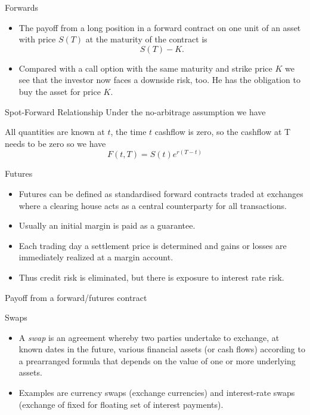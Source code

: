 {Forwards}
\begin{itemize}
\item<1->
The payoff from a long position in a forward contract on one unit
of an asset with price $S(T)$ at the maturity of the contract is
$$ S(T)-K.$$
\item<2-> Compared with a call option with the same maturity
and strike price $K$ we see that the investor now faces a downside
risk, too. He has the obligation to buy the asset for price $K$.
\end{itemize}

{Spot-Forward Relationship}
Under the no-arbitrage assumption we have

\begin{center}
\end{center}

All quantities are known at $t$, the time $t$ cashflow is zero, so the cashflow at T needs to be zero so we have $$F(t,T) = S(t)e^{r(T-t)}$$

{Futures}
\begin{itemize}
\item<1-> Futures can be defined as standardised forward contracts traded at exchanges where a clearing house acts as a central counterparty for all transactions.
\item<2-> Usually an initial margin is paid as a guarantee.
\item<3-> Each trading day a settlement price is determined and gains or losses are immediately realized at a margin account.
\item<4-> Thus credit risk is eliminated, but there is exposure to interest rate risk.

\end{itemize}

{Payoff from a forward/futures contract}
\begin{figure}
  \centering
   \qquad
\end{figure}

{Swaps}
\begin{itemize}
\item<1->
A {\it swap} is an agreement whereby two parties
undertake to exchange, at known dates in the future, various
financial assets (or cash flows) according to a prearranged
formula that depends on the value of one or more underlying
assets.
\item<2->
Examples are currency swaps (exchange currencies) and
interest-rate swaps (exchange of fixed for floating set of
interest payments).
\end{itemize}

